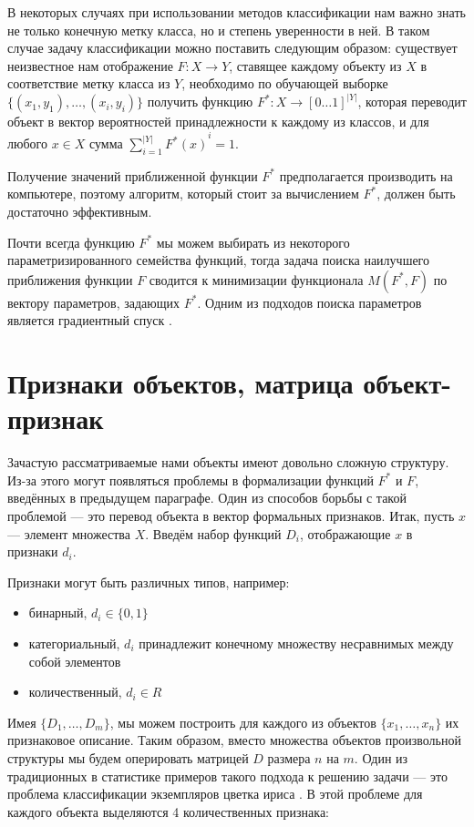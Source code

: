 В некоторых случаях при использовании методов классификации нам важно знать не только конечную метку класса, но и степень уверенности в ней. В таком случае задачу классификации можно поставить следующим образом: существует неизвестное нам отображение $F : X \to Y$, ставящее каждому объекту из $X$ в соответствие метку класса из $Y$, необходимо по обучающей выборке $\{ (x_1, y_1), \dots, (x_i, y_i) \}$ получить функцию $F^* : X \to [0 \dots 1]^{|Y|}$, которая переводит объект в вектор вероятностей принадлежности к каждому из классов, и для любого $x \in X$ сумма $\sum_{i=1}^{|Y|} {F^*(x)}^{i} = 1$.

Получение значений приближенной функции $F^*$ предполагается производить на компьютере, поэтому алгоритм, который стоит за вычислением $F^*$, должен быть достаточно эффективным. 

Почти всегда функцию $F^*$ мы можем выбирать из некоторого параметризированного семейства функций, тогда задача поиска наилучшего приближения функции $F$ сводится к минимизации функционала $M(F^*, F)$ по вектору параметров, задающих $F^*$. Одним из подходов поиска параметров является градиентный спуск \cite{gd}.

\section{Признаки объектов, матрица объект-признак}

Зачастую рассматриваемые нами объекты имеют довольно сложную структуру. Из-за этого могут появляться проблемы в формализации функций $F^*$ и $F$, введённых в предыдущем параграфе. Один из способов борьбы с такой проблемой — это перевод объекта в вектор формальных признаков.
Итак, пусть $x$ — элемент множества $X$. Введём набор функций $D_i$, отображающие $x$ в признаки $d_i$.

Признаки могут быть различных типов, например:
\begin{itemize}
\item бинарный, $d_i \in \{0, 1\}$
\item категориальный, $d_i$ принадлежит конечному множеству несравнимых между собой элементов
\item количественный, $d_i \in R$
\end{itemize}

Имея $\{D_1,…,D_m\}$, мы можем построить для каждого из объектов $\{x_1,…,x_n\}$ их признаковое описание. Таким образом, вместо множества объектов произвольной структуры мы будем оперировать матрицей $D$ размера $n$ на $m$.
Один из традиционных в статистике примеров такого подхода к решению задачи — это проблема классификации экземпляров цветка ириса \cite{iris}.
В этой проблеме для каждого объекта выделяются 4 количественных признака:

